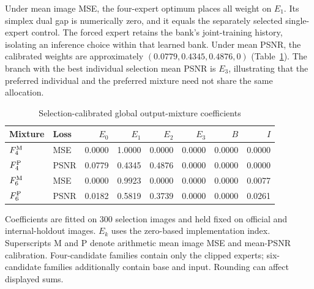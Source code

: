 \documentclass[12pt]{article}
\newcommand{\tabnote}[1]{\par\vspace{5pt}\noindent #1}
\begin{document}
Under mean image MSE, the four-expert optimum places all weight on $E_1$. Its simplex dual gap is numerically zero, and it equals the separately selected single-expert control. The forced expert retains the bank's joint-training history, isolating an inference choice within that learned bank. Under mean PSNR, the calibrated weights are approximately $(0.0779,0.4345,0.4876,0)$ (Table~\ref{tab:weights}). The branch with the best individual selection mean PSNR is $E_3$, illustrating that the preferred individual and the preferred mixture need not share the same allocation.
\begin{table}[t]
\caption{Selection-calibrated global output-mixture coefficients}
\label{tab:weights}
\begin{tabularx}{\linewidth}{@{}Xlrrrrrr@{}}
\toprule
Mixture & Loss & $E_0$ & $E_1$ & $E_2$ & $E_3$ & $B$ & $I$\\
\midrule
$F_4^{\rm M}$ & MSE & 0.0000 & 1.0000 & 0.0000 & 0.0000 & 0.0000 & 0.0000 \\
$F_4^{\rm P}$ & PSNR & 0.0779 & 0.4345 & 0.4876 & 0.0000 & 0.0000 & 0.0000 \\
$F_6^{\rm M}$ & MSE & 0.0000 & 0.9923 & 0.0000 & 0.0000 & 0.0000 & 0.0077 \\
$F_6^{\rm P}$ & PSNR & 0.0182 & 0.5819 & 0.3739 & 0.0000 & 0.0000 & 0.0261 \\
\bottomrule
\end{tabularx}
\tabnote{Coefficients are fitted on 300 selection images and held fixed on official and internal-holdout images. $E_k$ uses the zero-based implementation index. Superscripts M and P denote arithmetic mean image MSE and mean-PSNR calibration. Four-candidate families contain only the clipped experts; six-candidate families additionally contain base and input. Rounding can affect displayed sums.}
\end{table}
\end{document}
